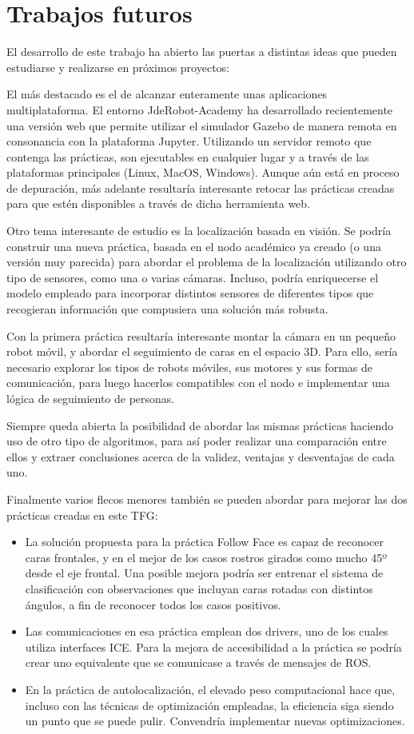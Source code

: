 \section{Trabajos futuros}
El desarrollo de este trabajo ha abierto las puertas a distintas ideas que pueden estudiarse y realizarse en próximos proyectos:

El más destacado es el de alcanzar enteramente unas aplicaciones multiplataforma. El entorno JdeRobot-Academy ha desarrollado recientemente una versión web que permite utilizar el simulador Gazebo de manera remota en consonancia con la plataforma Jupyter. Utilizando un servidor remoto que contenga las prácticas, son ejecutables en cualquier lugar y a través de las plataformas principales (Linux, MacOS, Windows). Aunque aún está en proceso de depuración, más adelante resultaría interesante retocar las prácticas creadas para que estén disponibles a través de dicha herramienta web. 

Otro tema interesante de estudio es la localización basada en visión. Se podría construir una nueva práctica, basada en el nodo académico ya creado (o una versión muy parecida) para abordar el problema de la localización utilizando otro tipo de sensores, como una o varias cámaras. Incluso, podría enriquecerse el modelo empleado para incorporar distintos sensores de diferentes tipos que recogieran información que compusiera una solución más robusta.

Con la primera práctica resultaría interesante montar la cámara en un pequeño robot móvil, y abordar el seguimiento de caras en el espacio 3D. Para ello, sería necesario explorar los tipos de robots móviles, sus motores y sus formas de comunicación, para luego hacerlos compatibles con el nodo e implementar una lógica de seguimiento de personas.

Siempre queda abierta la posibilidad de abordar las mismas prácticas haciendo uso de otro tipo de algoritmos, para así poder realizar una comparación entre ellos y extraer conclusiones acerca de la validez, ventajas y desventajas de cada uno.

Finalmente varios flecos menores también se pueden abordar para mejorar las dos prácticas creadas en este TFG:

\begin{itemize}
	\item La solución propuesta para la práctica Follow Face es capaz de reconocer caras frontales, y en el mejor de los casos rostros girados como mucho 45º desde el eje frontal. Una posible mejora podría ser entrenar el sistema de clasificación con observaciones que incluyan caras rotadas con distintos ángulos, a fin de reconocer todos los casos positivos.
	\item Las comunicaciones en esa práctica emplean dos drivers, uno de los cuales utiliza interfaces ICE. Para la mejora de accesibilidad a la práctica se podría crear uno equivalente que se comunicase a través de mensajes de ROS.
	\item En la práctica de autolocalización, el elevado peso computacional hace que, incluso con las técnicas de optimización empleadas, la eficiencia siga siendo un punto que se puede pulir. Convendría implementar nuevas optimizaciones.
\end{itemize} 